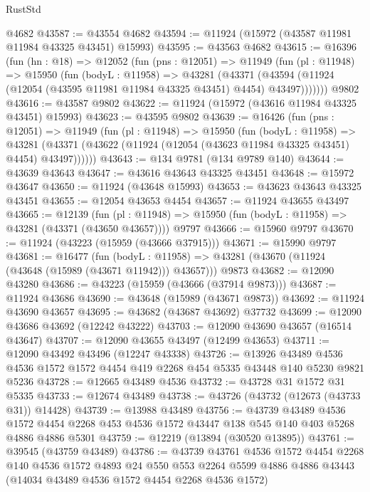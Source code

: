 \begin{lexlean}{RustStd}
\begin{coremodule}
    @4682
@43587 := @43554 @4682
@43594 := @11924 (@15972 (@43587 @11981 @11984 @43325 @43451) @15993)
@43595 := @43563 @4682
@43615 := @16396
    (fun (hn : @18) =>
    @12052
      (fun (pns : @12051) =>
      @11949
        (fun (pl : @11948) =>
        @15950
          (fun (bodyL : @11958) =>
          @43281
            (@43371
              (@43594 (@11924 (@12054 (@43595 @11981 @11984 @43325 @43451) @4454) @43497)))))))
    @9802
@43616 := @43587 @9802
@43622 := @11924 (@15972 (@43616 @11984 @43325 @43451) @15993)
@43623 := @43595 @9802
@43639 := @16426
    (fun (pns : @12051) =>
    @11949
      (fun (pl : @11948) =>
      @15950
        (fun (bodyL : @11958) =>
        @43281 (@43371 (@43622 (@11924 (@12054 (@43623 @11984 @43325 @43451) @4454) @43497))))))
@43643 := @134 @9781 (@134 @9789 @140)
@43644 := @43639 @43643
@43647 := @43616 @43643 @43325 @43451
@43648 := @15972 @43647
@43650 := @11924 (@43648 @15993)
@43653 := @43623 @43643 @43325 @43451
@43655 := @12054 @43653 @4454
@43657 := @11924 @43655 @43497
@43665 := @12139
    (fun (pl : @11948) => @15950 (fun (bodyL : @11958) => @43281 (@43371 (@43650 @43657))))
    @9797
@43666 := @15960 @9797
@43670 := @11924 (@43223 (@15959 (@43666 @37915)))
@43671 := @15990 @9797
@43681 := @16477
    (fun (bodyL : @11958) => @43281 (@43670 (@11924 (@43648 (@15989 (@43671 @11942))) @43657)))
    @9873
@43682 := @12090 @43280
@43686 := @43223 (@15959 (@43666 (@37914 @9873)))
@43687 := @11924 @43686
@43690 := @43648 (@15989 (@43671 @9873))
@43692 := @11924 @43690 @43657
@43695 := @43682 (@43687 @43692) @37732
@43699 := @12090 @43686 @43692 (@12242 @43222)
@43703 := @12090 @43690 @43657 (@16514 @43647)
@43707 := @12090 @43655 @43497 (@12499 @43653)
@43711 := @12090 @43492 @43496 (@12247 @43338)
@43726 := @13926
    @43489
    @4536
    @4536
    @1572
    @1572
    @4454
    @419
    @2268
    @454
    @5335
    @43448
    @140
    @5230
    @9821
    @5236
@43728 := @12665 @43489 @4536
@43732 := @43728 @31 @1572 @31 @5335
@43733 := @12674 @43489
@43738 := @43726 (@43732 (@12673 (@43733 @31)) @14428)
@43739 := @13988 @43489
@43756 := @43739
    @43489
    @4536
    @1572
    @4454
    @2268
    @453
    @4536
    @1572
    @43447
    @138
    @545
    @140
    @403
    @5268
    @4886
    @4886
    @5301
@43759 := @12219 (@13894 (@30520 @13895))
@43761 := @39545 (@43759 @43489)
@43786 := @43739
    @43761
    @4536
    @1572
    @4454
    @2268
    @140
    @4536
    @1572
    @4893
    @24
    @550
    @553
    @2264
    @5599
    @4886
    @4886
    @43443
    (@14034 @43489 @4536 @1572 @4454 @2268 @4536 @1572)

\end{coremodule}
\end{lexlean}
